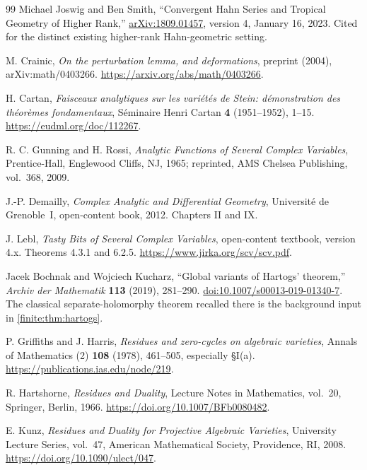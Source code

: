 \documentclass[11pt,letterpaper]{article}
\theoremstyle{definition}
\theoremstyle{remark}
\numberwithin{equation}{section}
\begin{document}
\begin{thebibliography}{99}
Michael Joswig and Ben Smith,
``Convergent Hahn Series and Tropical Geometry of Higher Rank,''
\href{https://arxiv.org/abs/1809.01457}{arXiv:1809.01457}, version 4,
January 16, 2023.
Cited for the distinct existing higher-rank Hahn-geometric setting.

M. Crainic, \emph{On the perturbation lemma, and deformations},
preprint (2004), arXiv:math/0403266.
\url{https://arxiv.org/abs/math/0403266}.

H. Cartan, \emph{Faisceaux analytiques sur les vari\'et\'es de Stein:
d\'emonstration des th\'eor\`emes fondamentaux},
S\'eminaire Henri Cartan \textbf{4} (1951--1952), 1--15.
\url{https://eudml.org/doc/112267}.

R. C. Gunning and H. Rossi,
\emph{Analytic Functions of Several Complex Variables},
Prentice-Hall, Englewood Cliffs, NJ, 1965;
reprinted, AMS Chelsea Publishing, vol.~368, 2009.

J.-P. Demailly, \emph{Complex Analytic and Differential Geometry},
Universit\'e de Grenoble~I, open-content book, 2012.
Chapters II and IX.

J. Lebl, \emph{Tasty Bits of Several Complex Variables},
open-content textbook, version 4.x.
Theorems 4.3.1 and 6.2.5.
\url{https://www.jirka.org/scv/scv.pdf}.

Jacek Bochnak and Wojciech Kucharz,
``Global variants of Hartogs' theorem,''
\emph{Archiv der Mathematik} \textbf{113} (2019), 281--290.
\href{https://doi.org/10.1007/s00013-019-01340-7}{doi:10.1007/s00013-019-01340-7}.
The classical separate-holomorphy theorem recalled there is the background
input in \cref{finite:thm:hartogs}.

P. Griffiths and J. Harris, \emph{Residues and zero-cycles on algebraic varieties},
Annals of Mathematics (2) \textbf{108} (1978), 461--505, especially \S I(a).
\url{https://publications.ias.edu/node/219}.

R. Hartshorne, \emph{Residues and Duality},
Lecture Notes in Mathematics, vol.~20, Springer, Berlin, 1966.
\url{https://doi.org/10.1007/BFb0080482}.

E. Kunz, \emph{Residues and Duality for Projective Algebraic Varieties},
University Lecture Series, vol.~47, American Mathematical Society, Providence, RI, 2008.
\url{https://doi.org/10.1090/ulect/047}.


\end{thebibliography}
\end{document}
